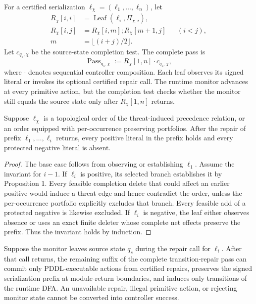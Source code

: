 \begin{definition}
For a certified serialization
$\boldsymbol\ell_\chi=(\ell_1,\ldots,\ell_n)$, let
\[
\begin{aligned}
R_\chi[i,i]&=\operatorname{Leaf}(\ell_i,\Pi_{\chi,i}),\\
R_\chi[i,j]&=R_\chi[i,m];R_\chi[m+1,j] && (i<j),\\
m&=\lfloor(i+j)/2\rfloor.
\end{aligned}
\]
Let $c_{q_s,\chi}$ be the source-state completion test. The complete pass is
\[
\operatorname{Pass}_{q_s,\chi}:=R_\chi[1,n]\cdot c_{q_s,\chi},
\]
where $\cdot$ denotes sequential controller composition. Each leaf
observes its signed literal or invokes its optional certified repair call. The
runtime monitor advances at every primitive action, but the completion test
checks whether the monitor still equals the source state only after
$R_\chi[1,n]$ returns.
\end{definition}

\begin{lemma}
Suppose $\boldsymbol\ell_\chi$ is a topological order of the threat-induced
precedence relation, or an order equipped with per-occurrence preserving
portfolios. After
the repair of prefix $\ell_1,\ldots,\ell_i$ returns, every positive literal in the
prefix holds and every protected negative literal is absent.
\end{lemma}

\begin{proof}
The base case follows from observing or establishing $\ell_1$. Assume the invariant
for $i-1$. If $\ell_i$ is positive, its selected branch establishes it by
Proposition 1. Every feasible completion delete that could affect an earlier
positive would induce a threat edge and hence contradict the order, unless the
per-occurrence portfolio explicitly excludes that branch. Every feasible add of
a protected negative is likewise excluded. If $\ell_i$ is negative, the leaf either
observes absence or uses an exact finite deleter whose complete net effects
preserve the prefix. Thus the invariant holds by induction.
\end{proof}

\begin{lemma}
Suppose the monitor leaves source state $q_s$ during the repair call for
$\ell_i$. After that call returns, the remaining suffix of the complete
transition-repair pass can
commit only PDDL-executable actions from certified repairs, preserves the signed
serialization prefix at module-return boundaries, and induces only transitions
of the runtime DFA. An unavailable repair, illegal primitive action, or rejecting
monitor state cannot be converted into controller success.
\end{lemma}

